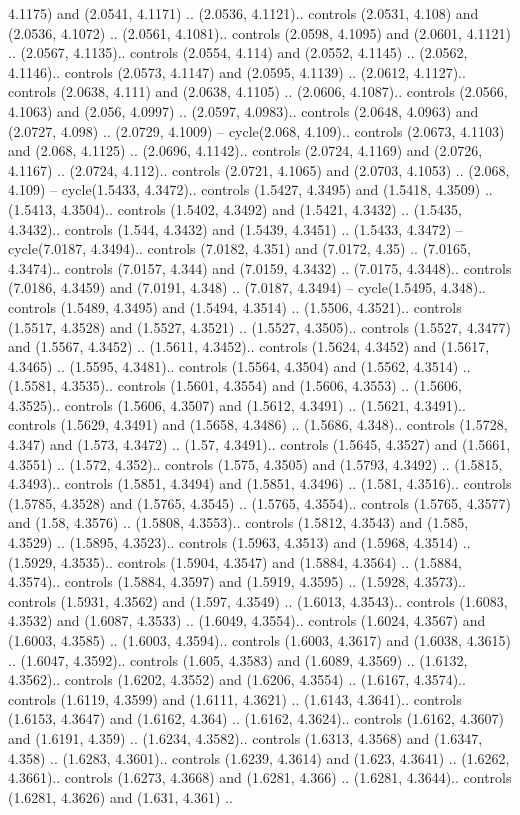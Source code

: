 4.1175) and (2.0541, 4.1171) .. (2.0536, 4.1121).. controls (2.0531, 4.108) and (2.0536, 4.1072) .. (2.0561, 4.1081).. controls (2.0598, 4.1095) and (2.0601, 4.1121) .. (2.0567, 4.1135).. controls (2.0554, 4.114) and (2.0552, 4.1145) .. (2.0562, 4.1146).. controls (2.0573, 4.1147) and (2.0595, 4.1139) .. (2.0612, 4.1127).. controls (2.0638, 4.111) and (2.0638, 4.1105) .. (2.0606, 4.1087).. controls (2.0566, 4.1063) and (2.056, 4.0997) .. (2.0597, 4.0983).. controls (2.0648, 4.0963) and (2.0727, 4.098) .. (2.0729, 4.1009) -- cycle(2.068, 4.109).. controls (2.0673, 4.1103) and (2.068, 4.1125) .. (2.0696, 4.1142).. controls (2.0724, 4.1169) and (2.0726, 4.1167) .. (2.0724, 4.112).. controls (2.0721, 4.1065) and (2.0703, 4.1053) .. (2.068, 4.109) -- cycle(1.5433, 4.3472).. controls (1.5427, 4.3495) and (1.5418, 4.3509) .. (1.5413, 4.3504).. controls (1.5402, 4.3492) and (1.5421, 4.3432) .. (1.5435, 4.3432).. controls (1.544, 4.3432) and (1.5439, 4.3451) .. (1.5433, 4.3472) -- cycle(7.0187, 4.3494).. controls (7.0182, 4.351) and (7.0172, 4.35) .. (7.0165, 4.3474).. controls (7.0157, 4.344) and (7.0159, 4.3432) .. (7.0175, 4.3448).. controls (7.0186, 4.3459) and (7.0191, 4.348) .. (7.0187, 4.3494) -- cycle(1.5495, 4.348).. controls (1.5489, 4.3495) and (1.5494, 4.3514) .. (1.5506, 4.3521).. controls (1.5517, 4.3528) and (1.5527, 4.3521) .. (1.5527, 4.3505).. controls (1.5527, 4.3477) and (1.5567, 4.3452) .. (1.5611, 4.3452).. controls (1.5624, 4.3452) and (1.5617, 4.3465) .. (1.5595, 4.3481).. controls (1.5564, 4.3504) and (1.5562, 4.3514) .. (1.5581, 4.3535).. controls (1.5601, 4.3554) and (1.5606, 4.3553) .. (1.5606, 4.3525).. controls (1.5606, 4.3507) and (1.5612, 4.3491) .. (1.5621, 4.3491).. controls (1.5629, 4.3491) and (1.5658, 4.3486) .. (1.5686, 4.348).. controls (1.5728, 4.347) and (1.573, 4.3472) .. (1.57, 4.3491).. controls (1.5645, 4.3527) and (1.5661, 4.3551) .. (1.572, 4.352).. controls (1.575, 4.3505) and (1.5793, 4.3492) .. (1.5815, 4.3493).. controls (1.5851, 4.3494) and (1.5851, 4.3496) .. (1.581, 4.3516).. controls (1.5785, 4.3528) and (1.5765, 4.3545) .. (1.5765, 4.3554).. controls (1.5765, 4.3577) and (1.58, 4.3576) .. (1.5808, 4.3553).. controls (1.5812, 4.3543) and (1.585, 4.3529) .. (1.5895, 4.3523).. controls (1.5963, 4.3513) and (1.5968, 4.3514) .. (1.5929, 4.3535).. controls (1.5904, 4.3547) and (1.5884, 4.3564) .. (1.5884, 4.3574).. controls (1.5884, 4.3597) and (1.5919, 4.3595) .. (1.5928, 4.3573).. controls (1.5931, 4.3562) and (1.597, 4.3549) .. (1.6013, 4.3543).. controls (1.6083, 4.3532) and (1.6087, 4.3533) .. (1.6049, 4.3554).. controls (1.6024, 4.3567) and (1.6003, 4.3585) .. (1.6003, 4.3594).. controls (1.6003, 4.3617) and (1.6038, 4.3615) .. (1.6047, 4.3592).. controls (1.605, 4.3583) and (1.6089, 4.3569) .. (1.6132, 4.3562).. controls (1.6202, 4.3552) and (1.6206, 4.3554) .. (1.6167, 4.3574).. controls (1.6119, 4.3599) and (1.6111, 4.3621) .. (1.6143, 4.3641).. controls (1.6153, 4.3647) and (1.6162, 4.364) .. (1.6162, 4.3624).. controls (1.6162, 4.3607) and (1.6191, 4.359) .. (1.6234, 4.3582).. controls (1.6313, 4.3568) and (1.6347, 4.358) .. (1.6283, 4.3601).. controls (1.6239, 4.3614) and (1.623, 4.3641) .. (1.6262, 4.3661).. controls (1.6273, 4.3668) and (1.6281, 4.366) .. (1.6281, 4.3644).. controls (1.6281, 4.3626) and (1.631, 4.361) .. 